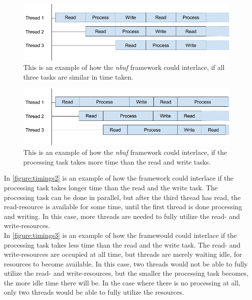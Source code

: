 \documentclass[a4paper]{article}
\newcommand{\nbuf}{\textit{nbuf} }
\begin{document}
\begin{figure}
	\begin{adjustwidth}{-0.5in}{-0.5in}
    \centering
     \includegraphics[scale=0.5]{figures/timings1.png}
  	\caption{This is an example of how the \nbuf framework could interlace, if all three tasks are similar in time taken.}
	\label{figure:timings1}
	\end{adjustwidth}
\end{figure}

\begin{figure}
	\begin{adjustwidth}{-0.5in}{-0.5in}
    \centering
     \includegraphics[scale=0.5]{figures/timings2.png}
  	\caption{This is an example of how the \nbuf framework could interlace, if the processing task takes more time than the read and write tasks.}
	\label{figure:timings2}
	\end{adjustwidth}
\end{figure}

In \autoref{figure:timings2} is an example of how the framework could interlace if the processing task takes longer time than the read and the write task. The processing task can be done in parallel, but after the third thread has read, the read-resource is available for some time, until the first thread is done processing and writing. In this case, more threads are needed to fully utilize the read- and write-resources.\\


In \autoref{figure:timings3} is an example of how the framewould could interlace if the processing task takes less time than the read and the write task. The read- and write-resources are occupied at all time, but threads are merely waiting idle, for resources to become available. In this case, two threads would not be able to fully utilize the read- and write-resources, but the smaller the processing task becomes, the more idle time there will be. In the case where there is no processing at all, only two threads would be able to fully utilize the resources. \\
\end{document}
